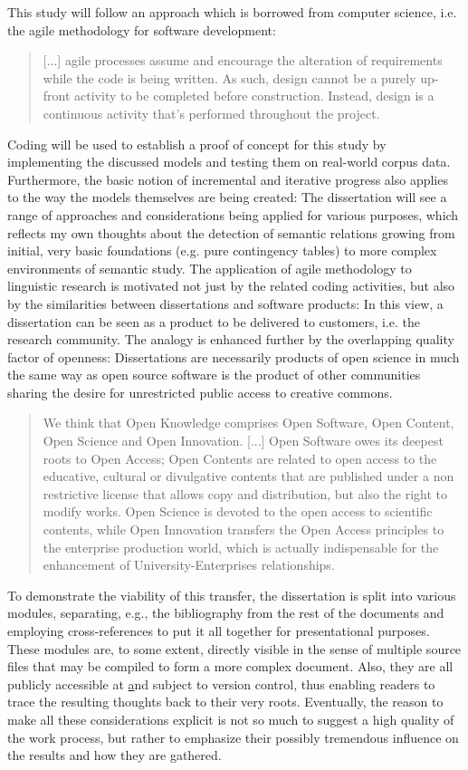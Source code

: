 \documentclass[jou]{apa6} %
\begin{document}
This study will follow an approach which is borrowed from computer science, i.e. the agile methodology for software development:
\blockquote[{\cite[p.~32]{fowlerAgileManifesto2001}}]{[...] agile processes assume and encourage the alteration of requirements while the code is being written. As such, design cannot be a purely up-front activity to be completed before construction. Instead, design is a continuous activity that's performed throughout the project.}
Coding will be used to establish a proof of concept for this study by implementing the discussed models and testing them on real-world corpus data. Furthermore, the basic notion of incremental and iterative progress also applies to the way the models themselves are being created: The dissertation will see a range of approaches and considerations being applied for various purposes, which reflects my own thoughts about the detection of semantic relations growing from initial, very basic foundations (e.g. pure contingency tables) to more complex environments of semantic study. The application of agile methodology to linguistic research is motivated not just by the related coding activities, but also by the similarities between dissertations and software products: In this view, a dissertation can be seen as a product to be delivered to customers, i.e. the research community. The analogy is enhanced further by the overlapping quality factor of openness: Dissertations are necessarily products of open science in much the same way as open source software is the product of other communities sharing the desire for unrestricted public access to creative commons.
\blockquote[{\cite[p.~518]{garcia-penalvoOpenKnowledgeManagement2010}}]{We think that Open Knowledge comprises Open Software, Open Content, Open Science and Open Innovation. [...] Open Software owes its deepest roots to Open Access; Open Contents are related to open access to the educative, cultural or divulgative contents that are published under a non restrictive license that allows copy and distribution, but also the right to modify works. Open Science is devoted to the open access to scientific contents, while Open Innovation transfers the Open Access principles to the enterprise production world, which is actually indispensable for the enhancement of University-Enterprises relationships.}
To demonstrate the viability of this transfer, the dissertation is split into various modules, separating, e.g., the bibliography from the rest of the documents and employing cross-references to put it all together for presentational purposes. These modules are, to some extent, directly visible in the sense of multiple source files that may be compiled to form a more complex document. Also, they are all publicly accessible at \href{https://github.com/konstantinschulz/asrael} and subject to version control, thus enabling readers to trace the resulting thoughts back to their very roots. Eventually, the reason to make all these considerations explicit is not so much to suggest a high quality of the work process, but rather to emphasize their possibly tremendous influence on the results and how they are gathered.


\printbibliography
\end{document}
